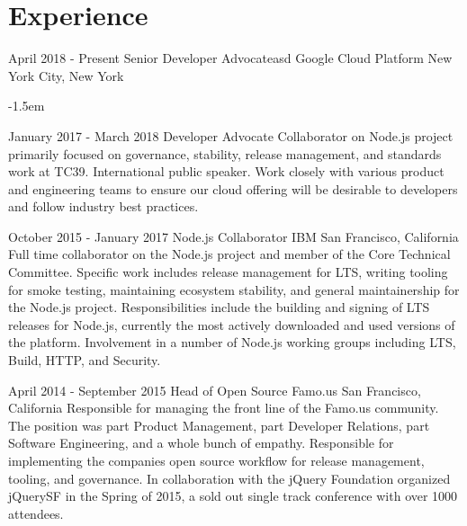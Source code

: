 \documentclass[10pt,a4paper,sans]{moderncv}   %
\begin{document}
\makecvtitle

\section{Experience}

\cventry
  {April 2018 - Present}
  {Senior Developer Advocateasd}
  {Google Cloud Platform}
  {New York City, New York}{}
  {}

\kern-1.5em

\cventry
  {January 2017 - March 2018}
  {Developer Advocate}
  {}
  {}{}
  {Collaborator on Node.js project primarily focused on governance, stability, release management, and standards work at TC39. International public speaker. Work closely with various product and engineering teams to ensure our cloud offering will be desirable to developers and follow industry best practices. }
  
\cventry
  {October 2015 - January 2017}
  {Node.js Collaborator}
  {IBM}
  {San Francisco, California}{}
  {Full time collaborator on the Node.js project and member of the Core Technical Committee. Specific work includes release management for LTS, writing tooling for smoke testing, maintaining ecosystem stability, and general maintainership for the Node.js project.  Responsibilities include the building and signing of LTS releases for Node.js, currently the most actively downloaded and used versions of the platform. Involvement in a number of Node.js working groups including LTS, Build, HTTP, and Security.  }

\cventry
  {April 2014 - September 2015}
  {Head of Open Source}
  {Famo.us}
  {San Francisco, California}{}
  {Responsible for managing the front line of the Famo.us community. The position was part Product Management, part Developer Relations, part Software Engineering, and a whole bunch of empathy.  Responsible for implementing the companies open source workflow for release management, tooling, and governance. In collaboration with the jQuery Foundation organized jQuerySF in the Spring of 2015, a sold out single track conference with over 1000 attendees.}

\end{document}
